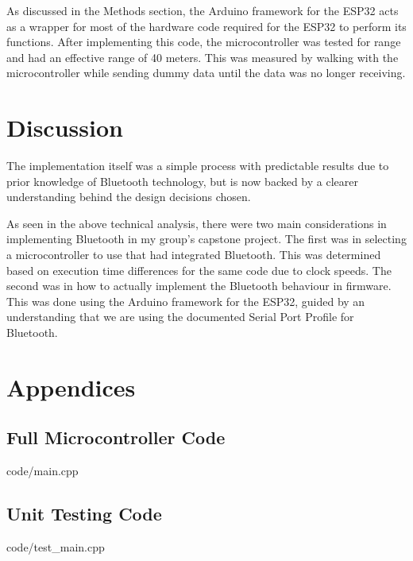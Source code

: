 \documentclass[12pt, titlepage]{article}
\begin{document}
As discussed in the Methods section, the Arduino framework for the ESP32 acts as a wrapper for most of the hardware code required for the ESP32 to perform its functions. After implementing this code, the microcontroller was tested for range and had an effective range of 40 meters. This was measured by walking with the microcontroller while sending dummy data until the data was no longer receiving.

\section{Discussion}
The implementation itself was a simple process with predictable results due to prior knowledge of Bluetooth technology, but is now backed by a clearer understanding behind the design decisions chosen.

As seen in the above technical analysis, there were two main considerations in implementing Bluetooth in my group's capstone project. The first was in selecting a microcontroller to use that had integrated Bluetooth. This was determined based on execution time differences for the same code due to clock speeds. The second was in how to actually implement the Bluetooth behaviour in firmware. This was done using the Arduino framework for the ESP32, guided by an understanding that we are using the documented Serial Port Profile for Bluetooth.

\clearpage



\clearpage
\appendix
\section{Appendices}
\subsection{Full Microcontroller Code}


{code/main.cpp}

\subsection{Unit Testing Code}


{code/test_main.cpp}
\end{document}
